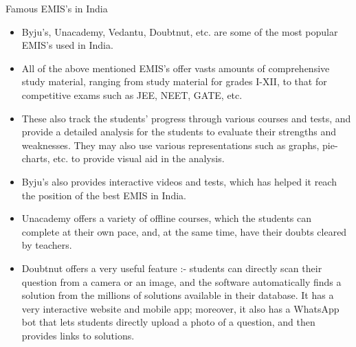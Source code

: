 \documentclass{beamer}
\begin{document}
\begin{frame}{Famous EMIS's in India}

\begin{itemize}
    \item Byju's, Unacademy, Vedantu, Doubtnut, etc. are some of the most popular EMIS's used in India.

    \item All of the above mentioned EMIS's offer vasts amounts of comprehensive study material, ranging from study material for grades I-XII, to that for competitive exams such as JEE, NEET, GATE, etc.

    \item These also track the students' progress through various courses and tests, and provide a detailed analysis for the students to evaluate their strengths and weaknesses. They may also use various representations such as graphs, pie-charts, etc. to provide visual aid in the analysis.

\end{itemize}

\end{frame}

\begin{frame}

\begin{itemize}

\item Byju's also provides interactive videos and tests, which has helped it reach the position of the best EMIS in India.

\item Unacademy offers a variety of offline courses, which the students can complete at their own pace, and, at the same time, have their doubts cleared by teachers.

\item Doubtnut offers a very useful feature :- students can directly scan their question from a camera or an image, and the software automatically finds a solution from the millions of solutions available in their database. It has a very interactive website and mobile app; moreover, it also has a WhatsApp bot that lets students directly upload a photo of a question, and then provides links to solutions.

\end{itemize}

\end{frame}
\end{document}
